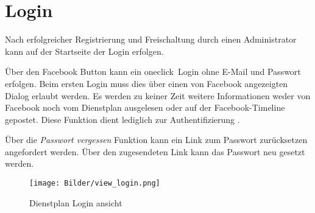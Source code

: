 \chapter{Login}
\label{cha:login}

Nach erfolgreicher Registrierung und Freischaltung durch einen Administrator kann auf der Startseite der Login erfolgen. 

\noindent Über den Facebook Button kann ein \glqq oneclick\grqq ~Login ohne E-Mail und Passwort erfolgen. Beim ersten Login muss dies über einen von Facebook angezeigten Dialog erlaubt werden. Es werden zu keiner Zeit weitere Informationen weder von Facebook noch vom Dienstplan ausgelesen oder auf der Facebook-Timeline gepostet. Diese Funktion dient lediglich zur Authentifizierung \cite{Facebook_Login}.

\vspace*{5mm} \noindent Über die \textit{Passwort vergessen} Funktion kann ein Link zum Passwort zurücksetzen angefordert werden. Über den zugesendeten Link kann das Passwort neu gesetzt werden.

\begin{figure}[h]
 \begin{addmargin}{-0.2\linewidth}
   \centering 
   \texttt{[image: Bilder/view\_login.png]}
 \end{addmargin} 
 \caption[Login ansicht]{Dienstplan Login ansicht}
 \label{fig:view_login}
\end{figure}